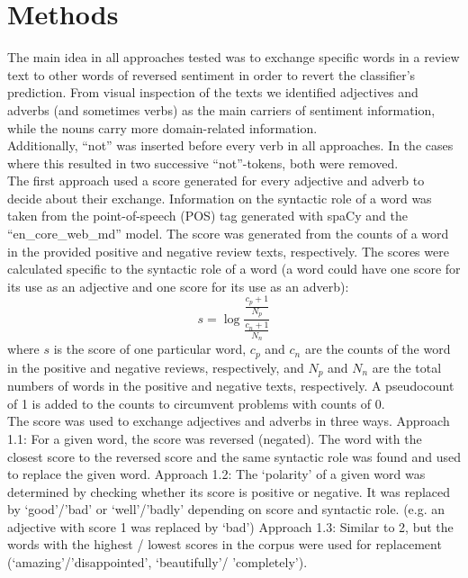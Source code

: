 \documentclass[11pt,a4paper]{article}
\begin{document}
\section{Methods}
The main idea in all approaches tested was to exchange specific words in a review text to other words of reversed sentiment in order to revert the classifier’s prediction. From visual inspection of the texts we identified adjectives and adverbs (and sometimes verbs) as the main carriers of sentiment information, while the nouns carry more domain-related information.\\
Additionally, ``not'' was inserted before every verb in all approaches. In the cases where this resulted in two successive ``not''-tokens, both were removed.\\
The first approach used a score generated for every adjective and adverb to decide about their exchange. Information on the syntactic role of a word was taken from the point-of-speech (POS) tag generated with spaCy \cite{spacy2} and the ``en\_core\_web\_md'' model. The score was generated from the counts of a word in the provided positive and negative review texts, respectively. The scores were calculated specific to the syntactic role of a word (a word could have one score for its use as an adjective and one score for its use as an adverb):\\
\begin{equation}
s=\log\frac{\frac{c_p+1}{N_p}}{\frac{c_n+1}{N_n}}
\end{equation}
where $s$ is the score of one particular word, $c_p$  and $c_n$ are the counts of the word in the positive and negative reviews, respectively, and $N_p$ and $N_n$ are the total numbers of words in the positive and negative texts, respectively. A pseudocount of 1 is added to the counts to circumvent problems with counts of 0.\\
The score was used to exchange adjectives and adverbs in three ways. Approach 1.1: For a given word, the score was reversed (negated). The word with the closest score to the reversed score and the same syntactic role was found and used to replace the given word. Approach 1.2: The ‘polarity’ of a given word was determined by checking whether its score is positive or negative. It was replaced by ‘good’/’bad’ or ‘well’/’badly’ depending on score and syntactic role. (e.g. an adjective with score 1 was replaced by ‘bad’) Approach 1.3: Similar to 2, but the words with the highest / lowest scores in the corpus were used for replacement (‘amazing’/’disappointed’, ‘beautifully’/ ’completely’).\\
\end{document}
